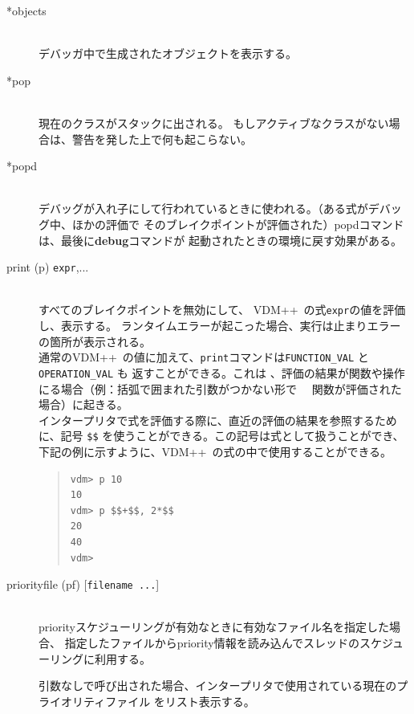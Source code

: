 \documentclass[\pformat,12pt]{jarticle}
\newcommand{\vdmslpp}{VDM++}
\begin{document}
\begin{description}
\item[*objects] \mbox{}\\
  デバッガ中で生成されたオブジェクトを表示する。

\item[*pop] \mbox{}\\
  現在のクラスがスタックに出される。
  もしアクティブなクラスがない場合は、警告を発した上で何も起こらない。

\item[*popd] \mbox{}\\
  デバッグが入れ子にして行われているときに使われる。（ある式がデバッグ中、ほかの評価で
  そのブレイクポイントが評価された）popdコマンドは、最後に\textbf{debug}コマンドが
  起動されたときの環境に戻す効果がある。
 
\item[print (p) {\tt expr},...] \mbox{}\\
  すべてのブレイクポイントを無効にして、 \vdmslpp\ の式{\tt expr}の値を評価し、表示する。
  ランタイムエラーが起こった場合、実行は止まりエラーの箇所が表示される。\\
  
  通常の\vdmslpp\ の値に加えて、{\tt print}コマンドは{\tt FUNCTION\_VAL}  と{\tt OPERATION\_VAL} も
  返すことができる。これは 、評価の結果が関数や操作にる場合（例：括弧で囲まれた引数がつかない形で
　関数が評価された場合）に起きる。\\
  
  インタープリタで式を評価する際に、直近の評価の結果を参照するために、記号
   {\tt \$\$}\index{\$\$} を使うことができる。この記号は式として扱うことができ、
  下記の例に示すように、\vdmslpp\ の式の中で使用することができる。

\begin{quote}
\begin{verbatim}
vdm> p 10
10
vdm> p $$+$$, 2*$$
20
40
vdm> 
\end{verbatim}
\end{quote}

\item[priorityfile (pf) \mbox{[{\tt filename ...}]}] \mbox{}\\
  priorityスケジューリングが有効なときに有効なファイル名を指定した場合、
  指定したファイルからpriority情報を読み込んでスレッドのスケジューリングに利用する。
  
  引数なしで呼び出された場合、インタープリタで使用されている現在のプライオリティファイル
  をリスト表示する。


\end{description}
\end{document}
